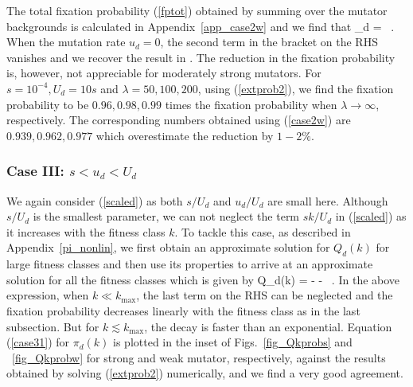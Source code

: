 \documentclass[preprint,12pt,number]{elsarticle}
\begin{document}
The total fixation probability (\ref{fptot}) obtained by summing over the mutator backgrounds is calculated in Appendix~\ref{app_case2w} and we find that 
\be
\Pi_d =   ~.
\label{case2w}
\ee
When the mutation rate $u_d=0$, the second term in the bracket on the RHS vanishes and we recover the result in \citep{James:2016}. The reduction in the fixation probability is, however, not appreciable for moderately strong mutators. For $s=10^{-4}, U_d=10 s$ and $\lambda=50, 100, 200$, using (\ref{extprob2}), we find the fixation probability to be $0.96, 0.98, 0.99$ times the fixation probability when $\lambda \to \infty$, respectively. The corresponding numbers obtained using (\ref{case2w}) are $0.939, 0.962, 0.977$ which overestimate the reduction by $1-2\%$. 

\subsubsection{Case III: $s < u_d < U_d$}
\label{reg3}

We again consider (\ref{scaled}) as both $s/U_d$ and $u_d/U_d$ are small here. Although $s/U_d$ is the smallest parameter, we can not neglect the term $s k/U_d$ in (\ref{scaled}) as it increases with the fitness class $k$.  To tackle this case, as described in Appendix~\ref{pi_nonlin}, we first obtain an approximate solution for $Q_d(k)$ for large fitness classes and then use its properties to arrive at an approximate solution for all the fitness classes which is given by 
\be
Q_d(k) =   - -    ~.
\label{case31}
\ee
In the above expression, when $k \ll k_{\max}$, the last term on the RHS can be neglected and the fixation probability decreases linearly with the fitness class as in the last subsection. But for $k \lesssim k_{\max}$, the decay is faster than an exponential. 
Equation (\ref{case31}) for $\pi_d(k)$ is plotted in the inset of Figs.~\ref{fig_Qkprobs} and ~\ref{fig_Qkprobw} for strong and weak mutator, respectively, against the results obtained by solving (\ref{extprob2}) numerically, and we find a very good agreement. 
\end{document}
